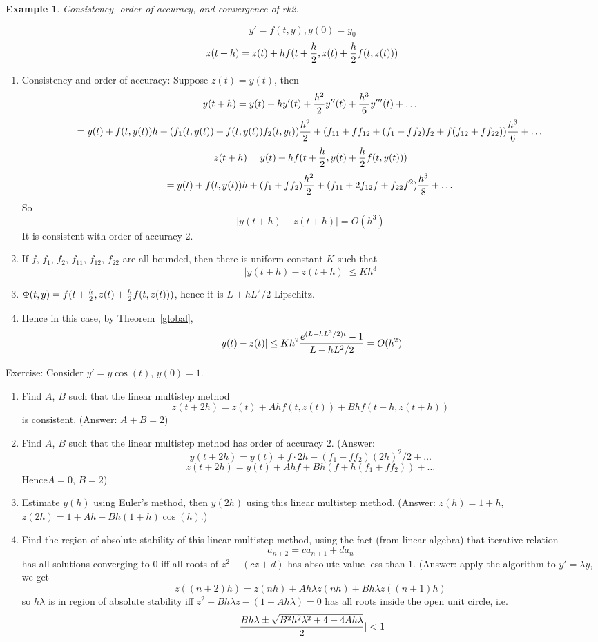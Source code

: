 \documentclass{article} %
\theoremstyle{break}
\newtheorem{exa}[definition]{Example}
\begin{document}
\begin{exa}Consistency, order of accuracy, and convergence of rk2.\end{exa}
\[y'=f(t, y), y(0)=y_0\]
\[z(t+h)=z(t)+hf(t+{h\over 2}, z(t)+{h\over 2}f(t, z(t)))\]
\begin{enumerate}
\item Consistency and order of accuracy:
  Suppose $z(t)=y(t)$, then
  \[y(t+h)=y(t)+hy'(t)+{h^2\over 2}y''(t)+{h^3\over 6}y'''(t)+\dots\]
  \[=y(t)+f(t, y(t))h+(f_1(t, y(t))+f(t, y(t))f_2(t, y_t)){h^2\over 2}+(f_{11}+ff_{12}+(f_1+ff_2)f_2+f(f_{12}+ff_{22})){h^3\over 6}+\dots\]
  \[z(t+h)=y(t)+hf(t+{h\over 2}, y(t)+{h\over 2}f(t, y(t)))\]
  \[=y(t)+f(t, y(t))h+(f_1+ff_2){h^2\over 2}+(f_{11}+2f_{12}f+f_{22}f^2){h^3\over 8}+\dots\]
  So
  \[|y(t+h)-z(t+h)|=O(h^3)\]
  It is consistent with order of accuracy $2$.
\item If $f$, $f_1$, $f_2$, $f_{11}$, $f_{12}$, $f_{22}$ are all bounded, then there is uniform constant $K$ such that
  \[|y(t+h)-z(t+h)|\leq Kh^3\]
\item $\Phi(t, y)=f(t+{h\over 2}, z(t)+{h\over 2}f(t, z(t)))$, hence it is $L+hL^2/2$-Lipschitz.
\item Hence in this case, by Theorem~\ref{global}, 
  \[|y(t)-z(t)|\leq Kh^2{e^{(L+hL^2/2)t}-1\over L+hL^2/2}=O(h^2)\]
\end{enumerate}


Exercise: Consider $y'=y\cos(t)$, $y(0)=1$.
\begin{enumerate}
\item Find $A$, $B$ such that the linear multistep method
  \[z(t+2h)=z(t)+Ahf(t, z(t))+Bhf(t+h, z(t+h))\]
  is consistent. (Answer: $A+B=2$)
\item Find $A$, $B$ such that the linear multistep method has order of accuracy $2$. (Answer:
  \[y(t+2h)=y(t)+f\cdot 2h+(f_1+ff_2)(2h)^2/2+\dots\]
\[z(t+2h)=y(t)+Ahf+Bh(f+h(f_1+ff_2))+\dots\]
  Hence$A=0$, $B=2$)
  

\item Estimate $y(h)$ using Euler's method, then $y(2h)$ using this linear multistep method. (Answer: $z(h)=1+h$, $z(2h)=1+Ah+Bh(1+h)\cos(h)$.)
\item Find the region of absolute stability of this linear multistep method, using the fact (from linear algebra) that iterative relation
  \[a_{n+2}=ca_{n+1}+da_n\]
  has all solutions converging to $0$ iff all roots of $z^2-(cz+d)$ has absolute value less than $1$. (Answer: apply the algorithm to $y'=\lambda y$, we get
  \[z((n+2)h)=z(nh)+Ah\lambda z(nh)+Bh\lambda z((n+1)h)\]
  so $h\lambda$ is in region of absolute stability iff $z^2-Bh\lambda z-(1+Ah\lambda)=0$ has all roots inside the open unit circle, i.e.
  \[|{Bh\lambda\pm\sqrt{B^2h^2\lambda^2+4+4Ah\lambda}\over 2}|<1\]
\end{enumerate}
\end{document}
